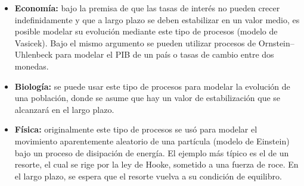 \begin{itemize}
    \item \textbf{Economía:} bajo la premisa de que las tasas de interés no pueden crecer indefinidamente y que a largo plazo se deben estabilizar en un valor medio, es posible modelar su evolución mediante este tipo de procesos (modelo de Vasicek). Bajo el mismo argumento se pueden utilizar procesos de Ornstein–Uhlenbeck para modelar el PIB de un país o tasas de cambio entre dos monedas.
    \item \textbf{Biología:} se puede usar este tipo de procesos para modelar la evolución de una población, donde se asume que hay un valor de estabilización que se alcanzará en el largo plazo.
    \item \textbf{Física:} originalmente este tipo de procesos se usó para modelar el movimiento aparentemente aleatorio de una partícula (modelo de Einstein) bajo un proceso de disipación de energía. El ejemplo más típico es el de un resorte, el cual se rige por la ley de Hooke, sometido a una fuerza de roce. En el largo plazo, se espera que el resorte vuelva a su condición de equilibro.
\end{itemize}